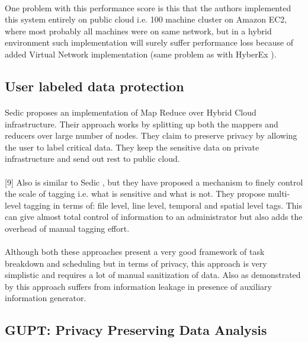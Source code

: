 \documentclass{report}
\begin{document}
\paragraph{}
One problem with this performance score is this that the authors implemented this system entirely on public cloud i.e. 100 machine cluster on Amazon EC2, where most probably all machines were on same network, but in a hybrid environment such implementation will surely suffer performance loss because of added Virtual Network implementation (same problem as with HyberEx \cite{ko2011hybrex}).
\subsection{User labeled data protection}
\paragraph{}
Sedic \cite{zhang2011sedic} proposes an implementation of Map Reduce over Hybrid Cloud infrastructure. Their approach works by splitting up both the mappers and reducers over large number of nodes. They claim to preserve privacy by allowing the user to label critical data. They keep the sensitive data on private infrastructure and send out rest to public cloud.
\paragraph{}
[9] Also is similar to Sedic \cite{zhang2011sedic}, but they have proposed a mechanism to finely control the scale of tagging i.e. what is sensitive and what is not. They propose multi-level tagging in terms of: file level, line level, temporal and spatial level tags. This can give almost total control of information to an administrator but also adds the overhead of manual tagging effort.
\paragraph{}
Although both these approaches present a very good framework of task breakdown and scheduling but in terms of privacy, this approach is very simplistic and requires a lot of manual sanitization of data. Also as demonstrated by \cite{dwork2004privacy} this approach suffers from information leakage in presence of auxiliary information generator.
\subsection{GUPT: Privacy Preserving Data Analysis}
\end{document}
